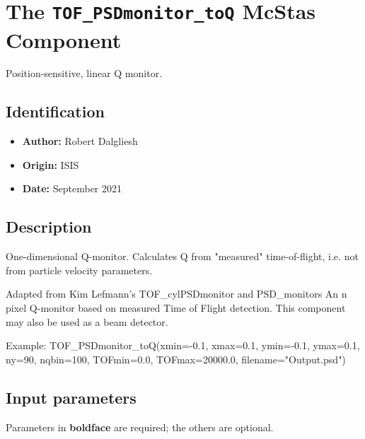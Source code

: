 \section{The \texttt{TOF\_PSDmonitor\_toQ} McStas Component}
Position-sensitive, linear Q monitor.

\subsection*{Identification}
\begin{itemize}
  \item \textbf{Author:} Robert Dalgliesh
  \item \textbf{Origin:} ISIS
  \item \textbf{Date:} September 2021
\end{itemize}

\subsection*{Description}
One-dimensional Q-monitor. Calculates Q from "measured" time-of-flight, i.e. not from particle velocity parameters.

Adapted from Kim Lefmann's TOF\_cylPSDmonitor and PSD\_monitors An n pixel Q-monitor based on measured Time of Flight detection. This component may also be used as a beam detector.

Example: TOF\_PSDmonitor\_toQ(xmin=-0.1, xmax=0.1, ymin=-0.1, ymax=0.1, ny=90, nqbin=100, TOFmin=0.0, TOFmax=20000.0, filename="Output.psd")

\subsection*{Input parameters}
Parameters in \textbf{boldface} are required; the others are optional.

